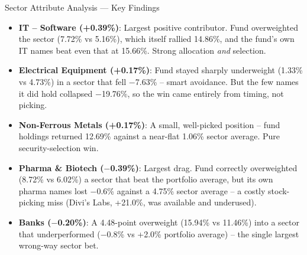 \documentclass[11pt, aspectratio=43]{beamer}
\begin{document}
\begin{frame}{Sector Attribute Analysis --- Key Findings}
\begin{itemize}
    \small
    \item \textcolor{posgreen}{\textbf{IT -- Software (+0.39\%)}}: Largest positive contributor. Fund overweighted the sector (7.72\% vs 5.16\%), which itself rallied 14.86\%, and the fund's own IT names beat even that at 15.66\%. Strong allocation \textit{and} selection.
    \item \textcolor{posgreen}{\textbf{Electrical Equipment (+0.17\%)}}: Fund stayed sharply underweight (1.33\% vs 4.73\%) in a sector that fell $-$7.63\% -- smart avoidance. But the few names it did hold collapsed $-$19.76\%, so the win came entirely from timing, not picking.
    \item \textcolor{posgreen}{\textbf{Non-Ferrous Metals (+0.17\%)}}: A small, well-picked position -- fund holdings returned 12.69\% against a near-flat 1.06\% sector average. Pure security-selection win.
    \item \textcolor{negred}{\textbf{Pharma \& Biotech ($-$0.39\%)}}: Largest drag. Fund correctly overweighted (8.72\% vs 6.02\%) a sector that beat the portfolio average, but its own pharma names lost $-$0.6\% against a 4.75\% sector average -- a costly stock-picking miss (Divi's Labs, +21.0\%, was available and underused).
    \item \textcolor{negred}{\textbf{Banks ($-$0.20\%)}}: A 4.48-point overweight (15.94\% vs 11.46\%) into a sector that underperformed ($-$0.8\% vs +2.0\% portfolio average) -- the single largest wrong-way sector bet.
\end{itemize}
\end{frame}
\end{document}
